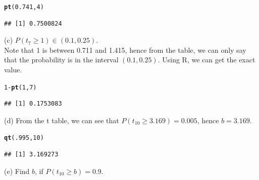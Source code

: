 \documentclass[bigtut]{tutorial}\usepackage[]{graphicx}\usepackage[]{color}
\makeatletter
\newcommand{\hlnum}[1]{\textcolor[rgb]{0.686,0.059,0.569}{#1}}%
\newcommand{\hlopt}[1]{\textcolor[rgb]{0,0,0}{#1}}%
\newcommand{\hlstd}[1]{\textcolor[rgb]{0.345,0.345,0.345}{#1}}%
\newcommand{\hlkwd}[1]{\textcolor[rgb]{0.737,0.353,0.396}{\textbf{#1}}}%
\newenvironment{kframe}{%
 \def\at@end@of@kframe{}%
 \ifinner\ifhmode%
  \def\at@end@of@kframe{\end{minipage}}%
  \begin{minipage}{\columnwidth}%
 \fi\fi%
 \def\FrameCommand##1{\hskip\@totalleftmargin \hskip-\fboxsep
 \colorbox{shadecolor}{##1}\hskip-\fboxsep
     \hskip-\linewidth \hskip-\@totalleftmargin \hskip\columnwidth}%
 \MakeFramed {\advance\hsize-\width
   \@totalleftmargin\z@ \linewidth\hsize
   \@setminipage}}%
 {\par\unskip\endMakeFramed%
 \at@end@of@kframe}
\newenvironment{knitrout}{}{} %
\makeatother
\begin{document}
\begin{tutorial}
\begin{questions}
\begin{solution}
\begin{knitrout}
\color{fgcolor}\begin{kframe}
\begin{alltt}
\hlkwd{pt}\hlstd{(}\hlnum{0.741}\hlstd{,}\hlnum{4}\hlstd{)}
\end{alltt}
\begin{verbatim}
## [1] 0.7500824
\end{verbatim}
\end{kframe}
\end{knitrout}

\vspace{.5cm}
(c)
$P(t_{7} \geq 1) \in (0.1,0.25)$. \\
Note that 1 is between 0.711 and 1.415, hence from the table, we can only say that the probability is in the interval $(0.1,0.25)$.
Using R, we can get the exact value. \\

\begin{knitrout}
\color{fgcolor}\begin{kframe}
\begin{alltt}
\hlnum{1}\hlopt{-}\hlkwd{pt}\hlstd{(}\hlnum{1}\hlstd{,}\hlnum{7}\hlstd{)}
\end{alltt}
\begin{verbatim}
## [1] 0.1753083
\end{verbatim}
\end{kframe}
\end{knitrout}


\vspace{.5cm}
(d)
From the t table, we can see that $P(t_{10} \geq 3.169) = 0.005$, hence $b=3.169$. \\

\begin{knitrout}
\color{fgcolor}\begin{kframe}
\begin{alltt}
\hlkwd{qt}\hlstd{(}\hlnum{.995}\hlstd{,}\hlnum{10}\hlstd{)}
\end{alltt}
\begin{verbatim}
## [1] 3.169273
\end{verbatim}
\end{kframe}
\end{knitrout}


\vspace{.5cm}
(e) Find $b$, if $P(t_{10} \geq b) = 0.9$.


\end{solution}
\end{questions}
\end{tutorial}
\end{document}
